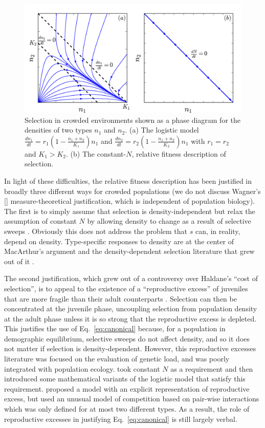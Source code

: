 \documentclass[11pt]{article}
\begin{document}
\begin{figure}
\centering
\includegraphics[scale=0.8]{Kplot.pdf}
\caption{\label{fig:Ksel} Selection in crowded environments shown as a phase diagram for the densities of two types $n_1$ and $n_2$. (a) The logistic model $\frac{dn_1}{dt}=r_1(1-\frac{n_1+n_2}{K_1})n_1$ and $\frac{dn_2}{dt}=r_2(1-\frac{n_1+n_2}{K_2})n_1$ with $r_1=r_2$ and $K_1>K_2$. (b) The constant-$N$, relative fitness description of selection.}
\end{figure}

In light of these difficulties, the relative fitness description has been justified in broadly three different ways for crowded populations (we do not discuss Wagner's [\citeyear{wagner_2010}] measure-theoretical justification, which is independent of population biology). The first is to simply assume that selection is density-independent but relax the assumption of constant $N$ by allowing density to change as a result of selective sweeps \citep[pp. 468]{barton_2007} \citep{prout_1980}. Obviously this  does not address the problem that $s$ can, in reality, depend on density. Type-specific responses to density are at the center of MacArthur's argument and the density-dependent selection literature that grew out of it \citep{roughgarden_1979}. 

The second justification, which grew out of a controversy over Haldane's ``cost of selection'', is to appeal to the existence of a ``reproductive excess'' of juveniles that are more fragile than their adult counterparts \citep{turner1968population,kimura1969natural,nei1971fertility}. Selection can then be concentrated at the juvenile phase, uncoupling selection from population density at the adult phase unless it is so strong that the reproductive excess is depleted. This justifies the use of Eq.~\eqref{eq:canonical} because, for a population in demographic equilibrium, selective sweeps do not affect density, and so it does not matter if selection is density-dependent. However, this reproductive excesses literature was focused on the evaluation of genetic load, and was poorly integrated with population ecology. \cite{kimura1969natural} took constant $N$ as a requirement and then introduced some mathematical variants of the logistic model that satisfy this requirement. \cite{nei1971fertility} proposed a model with an explicit representation of reproductive excess, but used an unusual model of competition based on pair-wise interactions which was only defined for at most two different types. As a result, the role of reproductive excesses in justifying Eq.~\eqref{eq:canonical} is still largely verbal.
\end{document}
